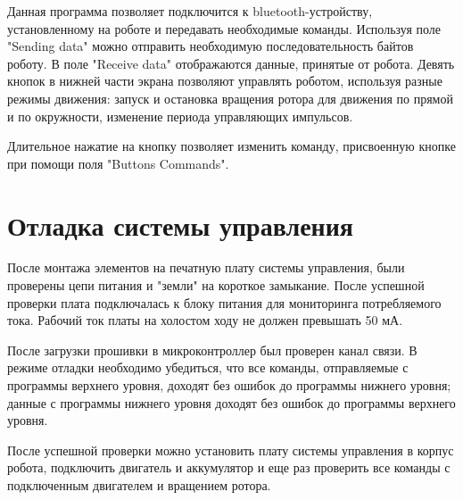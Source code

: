 Данная программа позволяет подключится к bluetooth-устройству, установленному на роботе и передавать необходимые команды. Используя поле "Sending data" можно отправить необходимую последовательность байтов роботу. В поле "Receive data" отображаются данные, принятые от робота. Девять кнопок в нижней части экрана позволяют управлять роботом, используя разные режимы движения: запуск и остановка вращения ротора для движения по прямой и по окружности, изменение периода управляющих импульсов.

Длительное нажатие на кнопку позволяет изменить команду, присвоенную кнопке при помощи поля "Buttons Commands".

\section{Отладка системы управления}

\qquad После монтажа элементов на печатную плату системы управления, были проверены цепи питания и "земли" на короткое замыкание. После успешной проверки плата подключалась к блоку питания для мониторинга потребляемого тока. Рабочий ток платы на холостом ходу не должен превышать 50 мА.

После загрузки прошивки в микроконтроллер был проверен канал связи. В режиме отладки необходимо убедиться, что все команды, отправляемые с программы верхнего уровня, доходят без ошибок до программы нижнего уровня; данные с программы нижнего уровня доходят без ошибок до программы верхнего уровня.

После успешной проверки можно установить плату системы управления в корпус робота, подключить двигатель и аккумулятор и еще раз проверить все команды с подключенным двигателем и вращением ротора.


\clearpage